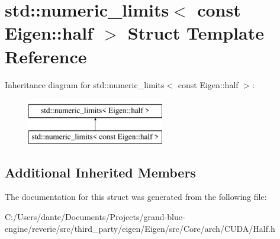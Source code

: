 \hypertarget{structstd_1_1numeric__limits_3_01const_01_eigen_1_1half_01_4}{}\section{std\+::numeric\+\_\+limits$<$ const Eigen\+::half $>$ Struct Template Reference}
\label{structstd_1_1numeric__limits_3_01const_01_eigen_1_1half_01_4}
Inheritance diagram for std\+::numeric\+\_\+limits$<$ const Eigen\+::half $>$\+:\begin{figure}[H]
\begin{center}
\leavevmode
\includegraphics[height=2.000000cm]{structstd_1_1numeric__limits_3_01const_01_eigen_1_1half_01_4}
\end{center}
\end{figure}
\subsection*{Additional Inherited Members}


The documentation for this struct was generated from the following file\+:\begin{DoxyCompactItemize}
\item 
C\+:/\+Users/dante/\+Documents/\+Projects/grand-\/blue-\/engine/reverie/src/third\+\_\+party/eigen/\+Eigen/src/\+Core/arch/\+C\+U\+D\+A/Half.\+h\end{DoxyCompactItemize}
